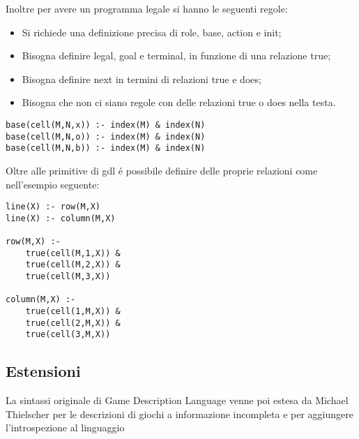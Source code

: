 Inoltre per avere un programma legale si hanno le seguenti regole:
\begin{itemize}
    \item Si richiede una definizione precisa di role, base, action e init;
    \item Bisogna definire legal, goal e terminal, in funzione di una relazione true; 
    \item Bisogna definire next in termini di relazioni true e does;
    \item Bisogna che non ci siano regole con delle relazioni true o does nella testa.
\end{itemize} 
\begin{lstlisting}[caption=Esempio: definizione cella di tris]
base(cell(M,N,x)) :- index(M) & index(N)
base(cell(M,N,o)) :- index(M) & index(N)
base(cell(M,N,b)) :- index(M) & index(N)
\end{lstlisting}
Oltre alle primitive di gdl é possibile definire delle proprie relazioni come nell'esempio seguente:
\begin{lstlisting}[caption=colonnet e righe in tris]
line(X) :- row(M,X)
line(X) :- column(M,X)

row(M,X) :- 
    true(cell(M,1,X)) &
    true(cell(M,2,X)) &
    true(cell(M,3,X)) 

column(M,X) :- 
    true(cell(1,M,X)) &
    true(cell(2,M,X)) &
    true(cell(3,M,X)) 
\end{lstlisting} 


\subsection{Estensioni}
La sintassi originale di Game Description Language venne poi estesa da Michael Thielscher per le descrizioni di giochi 
a informazione incompleta \cite*{GDL2} e per aggiungere l'introspezione al linguaggio  \cite*{GDL3}

